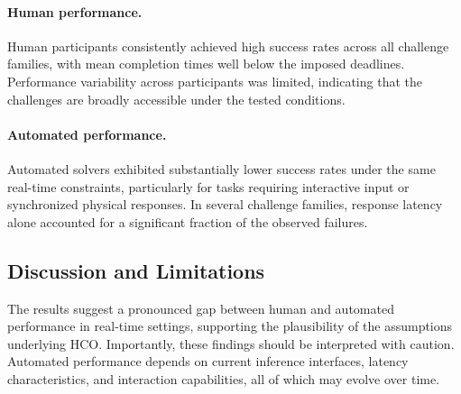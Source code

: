 \documentclass[11pt]{article}
\newcommand{\HCO}{HCO\xspace}
\begin{document}
\begin{table}[t]
	\centering
	\caption{Indicative empirical results under real-time constraints.}
	\label{tab:evaluation-results}
\end{table}



\paragraph{Human performance.}
Human participants consistently achieved high success rates across all challenge families, with mean completion times well below the imposed deadlines. Performance variability across participants was limited, indicating that the challenges are broadly accessible under the tested conditions.

\paragraph{Automated performance.}
Automated solvers exhibited substantially lower success rates under the same real-time constraints, particularly for tasks requiring interactive input or synchronized physical responses. In several challenge families, response latency alone accounted for a significant fraction of the observed failures.

\subsection{Discussion and Limitations}

The results suggest a pronounced gap between human and automated performance in real-time settings, supporting the plausibility of the assumptions underlying \HCO. Importantly, these findings should be interpreted with caution. Automated performance depends on current inference interfaces, latency characteristics, and interaction capabilities, all of which may evolve over time.
\end{document}
